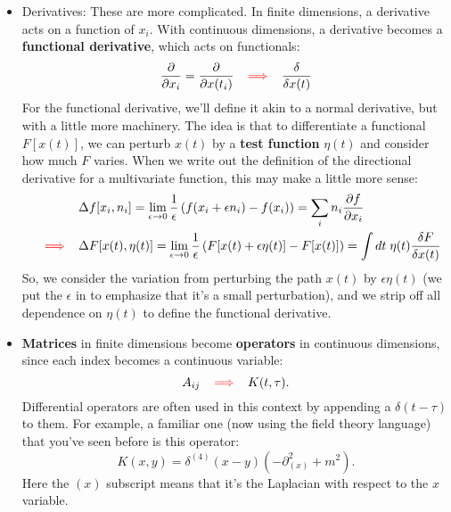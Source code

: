 \documentclass[12pt, oneside]{article}   	%
\theoremstyle{definition}
\begin{document}
\begin{itemize}
	\item Derivatives: These are more complicated. In finite dimensions, a derivative acts on a function of $x_i$. With continuous dimensions, a derivative becomes a \textbf{functional derivative}, which acts on functionals:
	\begin{align}
		\frac{\partial}{\partial x_i} = \frac{\partial}{\partial x(t_i)} \;\;\; {\color{red} \implies}\;\;\; \frac{\delta}{\delta x(t)} %
	\end{align}
	For the functional derivative, we'll define it akin to a normal derivative, but with a little more machinery. The idea is that to differentiate a functional $F[x(t)]$, we can perturb $x(t)$ by a \textbf{test function} $\eta(t)$ and consider how much $F$ varies. When we write out the definition of the directional derivative for a multivariate function, this may make a little more sense:
	\begin{align}
		&  \Delta f[ x_i, n_i ] = \lim_{\epsilon\rightarrow 0} \frac{1}{\epsilon}\left(f(x_i + \epsilon n_i) - f(x_i)\right) = \sum_i n_i \frac{\partial f}{\partial x_i} \\
		\;\;\; {\color{red} \implies}\;\;\;  & \Delta F[x(t), \eta(t)] = \lim_{\epsilon\rightarrow 0} \frac{1}{\epsilon}\left(F[x(t) + \epsilon\eta(t)] - F[x(t)]\right) = \int dt\; \eta(t) \frac{\delta F}{\delta x(t)}
	\end{align}
	So, we consider the variation from perturbing the path $x(t)$ by $\epsilon\eta(t)$ (we put the $\epsilon$ in to emphasize that it's a small perturbation), and we strip off all dependence on $\eta(t)$ to define the functional derivative. 
	
	\item \textbf{Matrices} in finite dimensions become \textbf{operators} in continuous dimensions, since each index becomes a continuous variable:
	\begin{equation}
		A_{ij} \;\;\; {\color{red} \implies}\;\;\; K(t, \tau).
	\end{equation}
	Differential operators are often used in this context by appending a $\delta(t - \tau)$ to them. For example, a familiar one (now using the field theory language) that you've seen before is this operator:
	\begin{equation}
		K(x, y) = \delta^{(4)}(x - y) (-\partial^2_{(x)} + m^2). 
	\end{equation}
	Here the $(x)$ subscript means that it's the Laplacian with respect to the $x$ variable. 
	

\end{itemize}
\end{document}
